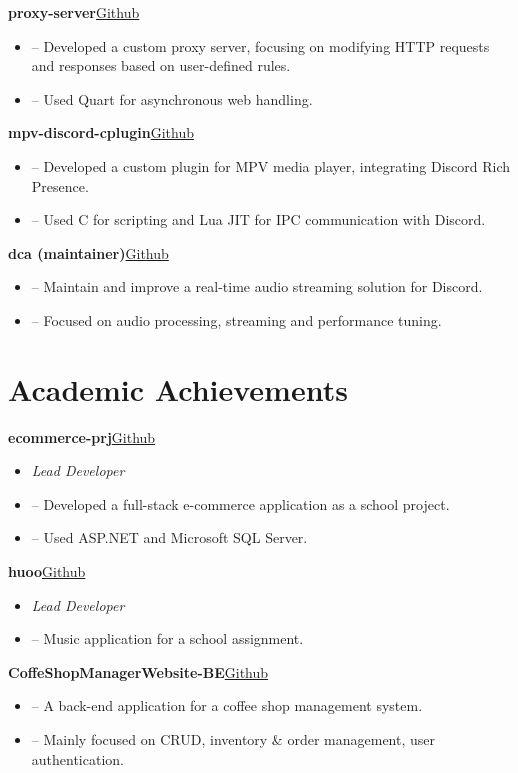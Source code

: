 \documentclass[a4paper,12pt]{article}
\newenvironment{itemList}[2]
    {
    \noindent\hspace{1em}\textbf{#1}\hfill#2\\[3.75pt]
    \begin{minipage}[t]{\linewidth}
    \begin{itemize}[nosep,after=\strut, leftmargin=2em, itemsep=3pt,label={}]
    }
    {
    \end{itemize}
    \end{minipage}
    }
\newcommand{\listSubHeading}[1]{
    \item[] \noindent\hspace{-1em}\textit{#1}
    }
\begin{document}
\begin{itemList}{proxy-server}{\href{https://github.com/foxeiz/proxy-server/}{Github}}
    \item -- Developed a custom proxy server, focusing on modifying HTTP requests and responses based on user-defined rules.
    \item -- Used Quart for asynchronous web handling.
\end{itemList}

\begin{itemList}{mpv-discord-cplugin}{\href{https://github.com/foxeiz/mpv-discord-cplugin/}{Github}}
    \item -- Developed a custom plugin for MPV media player, integrating Discord Rich Presence.
    \item -- Used C for scripting and Lua JIT for IPC communication with Discord.
\end{itemList}

\begin{itemList}{dca (maintainer)}{\href{https://github.com/foxeiz/dca/}{Github}}
    \item -- Maintain and improve a real-time audio streaming solution for Discord.
    \item -- Focused on audio processing, streaming and performance tuning.
\end{itemList}

\newpage
\section{Academic Achievements}

\begin{itemList}{ecommerce-prj}{\href{https://github.com/FoxeiZ/ecommerce-prj/}{Github}}
    \listSubHeading{Lead Developer}
    \item -- Developed a full-stack e-commerce application as a school project.
    \item -- Used ASP.NET and Microsoft SQL Server.
\end{itemList}

\begin{itemList}{huoo}{\href{https://github.com/foxeiz/huoo/}{Github}}
    \listSubHeading{Lead Developer}
    \item -- Music application for a school assignment.
\end{itemList}

\begin{itemList}{CoffeShopManagerWebsite-BE}{\href{https://github.com/foxeiz/CoffeShopManagerWebsite-BE/}{Github}}
    \item -- A back-end application for a coffee shop management system.
    \item -- Mainly focused on CRUD, inventory \& order management, user authentication.
\end{itemList}
\end{document}
